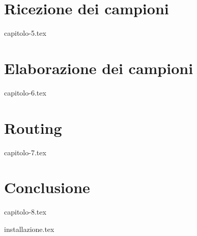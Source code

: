 \documentclass[a4paper, 12pt, twoside, openright]{book}
\begin{document}
\chapter{Ricezione dei campioni} %
\thispagestyle{empty}
{capitolo-5.tex}

\chapter{Elaborazione dei campioni} %
\thispagestyle{empty}
{capitolo-6.tex}

\chapter{Routing} %
\thispagestyle{empty}
{capitolo-7.tex}

\chapter{Conclusione} %
\thispagestyle{empty}
{capitolo-8.tex}

\begin{appendices}
{installazione.tex} %
\end{appendices}

\backmatter

\begingroup %
  \makeatletter
  \let\ps@plain\ps@empty
  \makeatother
  \printbibliography[
    heading=bibintoc,
    title={Bibliografia} ]
\endgroup
\end{document}
